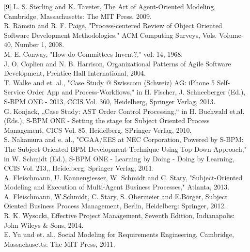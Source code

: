 [9] 	L. S. Sterling and K. Taveter, The Art of Agent-Oriented Modeling, Cambridge, Massachusetts: The MIT Press, 2009. 
\\
[10] 	R. Ramsin and R. F. Paige, "Process-centered Review of Object Oriented Software Development Methodologies," ACM Computing Surveys, Vols. Volume-40, Number 1, 2008. 
\\
[11] 	M. E. Conway, "How do Committees Invent?," vol. 14, 1968.
\\ 
[12] 	J. O. Coplien and N. B. Harrison, Organizational Patterns of Agile Software Development, Prentice Hall International, 2004. 
\\
[13] 	T. Walke and et. al., "Case Study @ Swisscom (Schweiz) AG: iPhone 5 Self-Service Order App and Process-Workflows," in H. Fischer, J. Schneeberger (Ed.), S-BPM ONE - 2013, CCIS Vol. 360, Heidelberg, Springer Verlag, 2013. 
\\
[14] 	G. Konjack, „Case Study: AST Order Control Processing,“ in H. Buchwald et.al. (Eds.), S-BPM ONE - Setting the stage for Subject Oriented Process Management, CICS Vol. 85, Heidelberg, SPringer Verlag, 2010. 
\\
[15] 	S. Nakamura and e. al., "CGAA/EES at NEC Corporation, Powered by S-BPM: The Subject-Oriented BPM Development Technique Using Top-Down Approach," in W. Schmidt (Ed.), S-BPM ONE - Learning by Doing - Doing by Learning, CCIS Vol. 213,, Heidelberg, Springer Verlag, 2011. 
\\
[16] 	A. Fleischmann, U. Kannengiesser, W. Schmidt and C. Stary, "Subject-Oriented Modeling and Execution of Multi-Agent Business Processes," Atlanta, 2013. 
\\
[17] 	A. Fleischmann, W.Schmidt, C. Stary, S. Obermeier and E.Börger, Subject Oiented Business Process Management, Berlin, Heidelberg: Springer, 2012. 
\\
[18] 	R. K. Wysocki, Effective Project Management, Seventh Edition, Indianapolis: John Wileys & Sons, 2014. 
\\
[19] 	E. Yu und et. al., Social Modeling for Requirements Engineering, Cambridge, Massachusetts: The MIT Press, 2011. 





